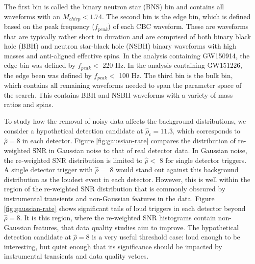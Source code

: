 The first bin is called the binary neutron star (BNS) bin and contains all waveforms
with an $M_{chirp} < 1.74$.
The second bin is the edge bin, which is defined based on the peak frequency ($f_{peak}$)
of each CBC waveform.
These are waveforms that are typically rather short in duration and are comprised of
both binary black hole (BBH) and neutron star-black hole (NSBH) binary waveforms
with high masses and anti-aligned effective spins.
In the analysis containing GW150914, the edge bin was
defined by $f_{peak} <$ 220 Hz. In the analysis containing GW151226, the edge been
was defined by $f_{peak} <$ 100 Hz.
The third bin is the bulk bin, which contains all remaining
waveforms needed to span the parameter space of the search. This contains BBH and NSBH
waveforms with a variety of mass ratios and spins.

To study how the removal of noisy data affects the background distributions, we consider a
hypothetical detection candidate at $\hat{\rho}_{c} = 11.3$, which corresponds to
$\hat{\rho} = 8$ in each detector. Figure \ref{fig:gaussian-rate} compares the distribution
of re-weighted SNR in Gaussian noise to that of real detector data.
In Gaussian noise, the re-weighted SNR distribution is limited to
$\hat{\rho} <$ 8 for single
detector triggers. A single detector trigger with $\hat{\rho} =$ 8 would stand out against this
background distribution as the loudest event in each detector. However, this is well within
the region of the re-weighted SNR distribution that is commonly obscured by instrumental transients
and non-Gaussian features in the data. Figure \ref{fig:gaussian-rate} shows significant tails
of loud triggers in each detector beyond $\hat{\rho} = 8$. It is this region, where the
re-weighted SNR histograms contain non-Gaussian features, that data quality
studies aim to improve.
The hypothetical detection candidate at $\hat{\rho} = 8$ is a very useful threshold case:
loud enough to be interesting, but quiet
enough that its significance should be impacted by instrumental transients and data quality
vetoes.

